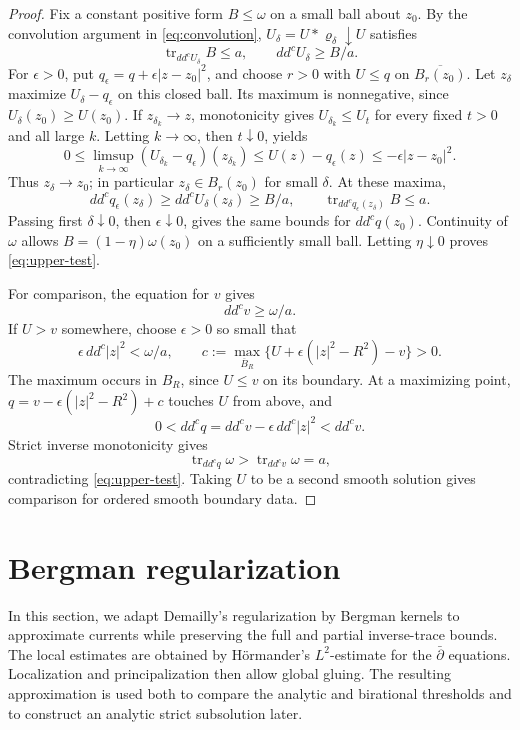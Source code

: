 \documentclass[reqno]{amsart}
\numberwithin{equation}{section}
\theoremstyle{definition}
\DeclareMathOperator{\tr}{tr}
\begin{document}
\begin{proof}
Fix a constant positive form $B\le\omega$ on a small ball
about $z_0$. By the convolution argument in \eqref{eq:convolution},
$U_\delta=U*\varrho_\delta\downarrow U$ satisfies
\begin{equation}\label{eq:trace-comparison}
\tr_{dd^cU_\delta}B\le a,\qquad
dd^cU_\delta\ge B/a.
\end{equation}
For $\epsilon>0$, put $q_\epsilon=q+\epsilon|z-z_0|^2$,
and choose $r>0$ with $U\le q$ on
$\overline{B_r(z_0)}$. Let $z_\delta$ maximize
$U_\delta-q_\epsilon$ on this closed ball. Its maximum is
nonnegative, since $U_\delta(z_0)\ge U(z_0)$.
If $z_{\delta_k}\to z$, monotonicity gives
$U_{\delta_k}\le U_t$ for every fixed $t>0$ and all large
$k$. Letting $k\to\infty$, then $t\downarrow0$, yields
\[
0\le\limsup_{k\to\infty}
 (U_{\delta_k}-q_\epsilon)(z_{\delta_k})
\le U(z)-q_\epsilon(z)
\le-\epsilon|z-z_0|^2.
\]
Thus $z_\delta\to z_0$; in particular $z_\delta\in B_r(z_0)$
for small $\delta$. At these maxima,
\[
dd^cq_\epsilon(z_\delta)\ge dd^cU_\delta(z_\delta)\ge B/a,
\qquad
\tr_{dd^cq_\epsilon(z_\delta)}B\le a.
\]
Passing first $\delta\downarrow0$, then $\epsilon\downarrow0$,
gives the same bounds for $dd^cq(z_0)$.
Continuity of $\omega$ allows
$B=(1-\eta)\omega(z_0)$ on a sufficiently small ball.
Letting $\eta\downarrow0$ proves
\eqref{eq:upper-test}.

For comparison, the equation for $v$ gives
\begin{equation}\label{eq:trace-lower}
dd^cv\ge\omega/a.
\end{equation}
 If $U>v$ somewhere, choose $\epsilon>0$
so small that
\[
\epsilon\,dd^c|z|^2<\omega/a,\qquad
c:=\max_{\overline B_R}
 \{U+\epsilon(|z|^2-R^2)-v\}>0.
\]
The maximum occurs in $B_R$, since $U\le v$ on its
boundary. At a maximizing point,
$q=v-\epsilon(|z|^2-R^2)+c$ touches $U$ from above, and
\[
0<dd^cq=dd^cv-\epsilon\,dd^c|z|^2<dd^cv.
\]
Strict inverse monotonicity gives
\[
\tr_{dd^cq}\omega
>\tr_{dd^cv}\omega=a,
\]
contradicting \eqref{eq:upper-test}.
Taking $U$ to be a second smooth solution gives comparison
for ordered smooth boundary data.\qedhere
\end{proof}

\section{Bergman regularization}\label{sec:bergman}
In this section, we adapt Demailly's regularization \cite{D92} by Bergman kernels to approximate currents while preserving the 
full and partial inverse-trace bounds. The local estimates are obtained by H\"ormander's $L^2$-estimate for the $\bar\partial$ equations. Localization and principalization then allow
global gluing. The resulting approximation is used both to compare
the analytic and birational thresholds and to construct an analytic strict subsolution later.
\end{document}
